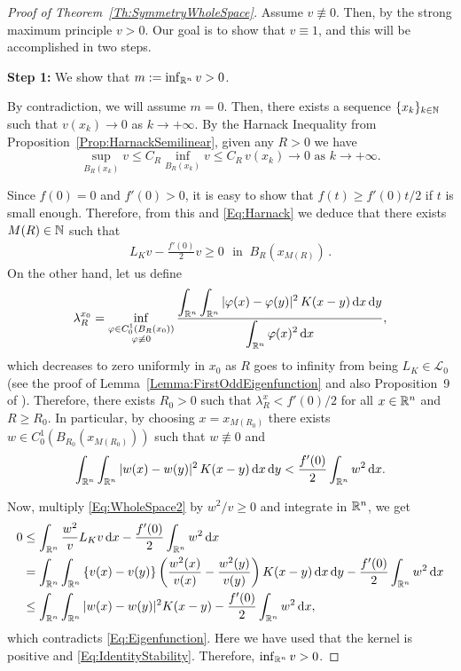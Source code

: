 \begin{proof}[Proof of Theorem~\ref{Th:SymmetryWholeSpace}]


Assume $v\not\equiv 0$. Then, by the strong maximum principle $v>0$. Our goal is to show that $v
\equiv 1$, and this will be accomplished in two steps.

\textbf{Step 1:} We show that $m:=\inf_{\mathbb{R}^n} v >0$.

By contradiction, we will assume $m=0$. Then, there exists a sequence $\{x_k\}_{k\in\mathbb{N}}$ such that
$v(x_k)\rightarrow 0$ as $k \rightarrow +\infty$. By the Harnack Inequality from Proposition~\ref{Prop:HarnackSemilinear}, given any $R>0$ we have 
\begin{equation}
\label{Eq:Harnack}
\sup_{B_R(x_k)}v \leq C_R \inf_{B_R(x_k)}v \leq C_R \, v(x_k) \rightarrow 0 \,\,\text{as}\,\, k\rightarrow +\infty.
\end{equation}


Since $f(0) = 0 $ and $f'(0)>0$, it is easy to show that $f(t)\geq f'(0)t/2$ if $t$ is small
enough. Therefore, from this and \eqref{Eq:Harnack}  we deduce that there exists $M(R)\in\mathbb{N}$ such
that
\begin{align}
\label{Eq:WholeSpace2}
L_K  v - \frac{f'(0)}{2}v \geq 0 \,\,\textrm{ in }\ B_R(x_{M(R)})\,.
\end{align}
On the other hand, let us define
$$ \lambda_R^{x_0} = \inf_{\substack{\varphi\in C^1_0(B_R(x_0))\\ \varphi\not\equiv 0}} \frac{\displaystyle \int_{\mathbb{R}^n}\int_{\mathbb{R}^n}|\varphi(x)-\varphi(y)|^2\,K(x-y) \,\mathrm{d} x \,\mathrm{d} y}{\displaystyle \int_{\mathbb{R}^n}\varphi(x)^2 \,\mathrm{d} x}, $$
which decreases to zero uniformly in $x_0$ as $R$ goes to infinity from being $L_K \in\mathcal{L}_0$ (see the proof of Lemma~\ref{Lemma:FirstOddEigenfunction} and also Proposition~9 of \cite{ServadeiValdinoci}). Therefore, there exists $R_0>0$ such that $ \lambda_R^x < f'(0)/2$ for all $x\in \mathbb{R}^n$ and $R\geq R_0$. In particular, by choosing $x=x_{M(R_0)}$ there exists $w\in C^1_0(B_{R_0}(x_{M(R_0)}))$ such that $w\not\equiv 0$ and
\begin{equation}
\label{Eq:Eigenfunction}
\int_{\mathbb{R}^n}\int_{\mathbb{R}^n}|w(x)-w(y)|^2\,K(x-y) \,\mathrm{d} x \,\mathrm{d} y < \frac{f'(0)}{2}\int_{\mathbb{R}^n}w^2 \,\mathrm{d} x.
\end{equation}

Now, multiply \eqref{Eq:WholeSpace2} by $w^2/v\geq 0$ and integrate in $\mathbb{R}^n$, we get
\begin{align*}
0 &\leq \int_{\mathbb{R}^n} \frac{w^2}{v}  L_K v \,\mathrm{d} x - \frac{f'(0)}{2}\int_{\mathbb{R}^n} w^2 \,\mathrm{d} x \\
&= \int_{\mathbb{R}^n}\int_{\mathbb{R}^n}\left\{ v(x)-v(y) \right\} \left( \frac{w^2(x)}{v(x)}-\frac{w^2(y)}{v(y)} \right) K(x-y) \,\mathrm{d} x \,\mathrm{d} y - \frac{f'(0)}{2}\int_{\mathbb{R}^n} w^2 \,\mathrm{d} x \\
&\leq \int_{\mathbb{R}^n}\int_{\mathbb{R}^n} |w(x)-w(y)|^2 K(x-y) - \frac{f'(0)}{2}\int_{\mathbb{R}^n} w^2 \,\mathrm{d} x ,
\end{align*}
which contradicts \eqref{Eq:Eigenfunction}. Here we have used that the kernel is positive and \eqref{Eq:IdentityStability}. Therefore, $\inf_{\mathbb{R}^n} v >0$.


\end{proof}
